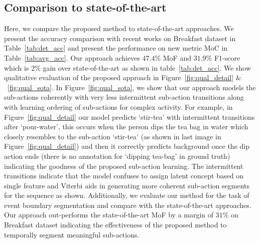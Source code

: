 \documentclass[final]{cvpr}
\begin{document}
\subsection{Comparison to state-of-the-art}
\par Here, we compare the proposed method to state-of-the-art approaches.
We present the accuracy comparison with recent works on Breakfast dataset in Table~\ref{tab:det_acc} and present the performance on new metric MoC in Table~\ref{tab:avg_acc}. 
Our approach achieves $47.4\%$ MoF and $31.9\%$ F1-score which is $2\%$ gain over state-of-the-art as shown in table~\ref{tab:det_acc}.
We show qualitative evaluation of the proposed approach in Figure~\ref{fig:qual_detail} \& ~\ref{fig:qual_sota}. In Figure~\ref{fig:qual_sota}, we show that our approach models the sub-actions coherently with very less intermittent sub-action transitions along with learning ordering of sub-actions for complex activity. For example, in Figure~\ref{fig:qual_detail} our model predicts `stir-tea' with intermittent transitions after `pour-water', this occurs when the person dips the tea bag in water which closely resembles to the sub-action `stir-tea' (as shown in last image in Figure~\ref{fig:qual_detail}) and then it correctly predicts background once the dip action ends (there is no annotation for `dipping tea-bag' in ground truth) indicating the goodness of the proposed sub-action learning. The intermittent transitions indicate that the model confuses to assign latent concept based on single feature and Viterbi aids in generating more coherent sub-action segments for the sequence as shown. %
Additionally, we evaluate our method for the task of event boundary segmentation and compare with the state-of-the-art approaches. Our approach out-performs the state-of-the-art MoF by a margin of $31\%$ on Breakfast dataset indicating the effectiveness of the proposed method to temporally segment meaningful sub-actions.%

\end{document}
